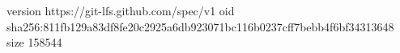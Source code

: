 version https://git-lfs.github.com/spec/v1
oid sha256:811fb129a83df8fe20c2925a6db923071bc116b0237cff7bebb4f6bf34313648
size 158544
